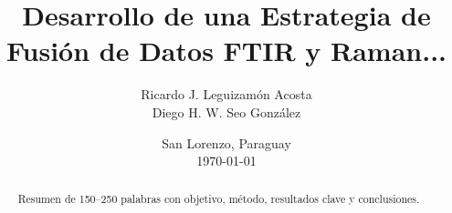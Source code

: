 \documentclass[12pt,oneside]{report}
\title{Desarrollo de una Estrategia de Fusión de Datos FTIR y Raman...}
\author{Ricardo J. Leguizamón Acosta \\ Diego H. W. Seo González}
\date{San Lorenzo, Paraguay \\ \today}
\begin{document}
\maketitle

\begin{abstract}
Resumen de 150–250 palabras con objetivo, método, resultados clave y conclusiones.
\end{abstract}

\tableofcontents
\listoffigures
\listoftables
\cleardoublepage
{}







\printbibliography
\appendix
\end{document}
